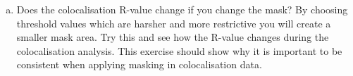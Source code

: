 \documentclass[a4paper,oneside,article]{memoir}
\begin{document}
\begin{enumerate}[(a)]
      \item Does the colocalisation R-value change if you change the
      mask? By choosing threshold values which are harsher and more
      restrictive you will create a smaller mask area. Try this and see
      how the R-value changes during the colocalisation analysis. This
      exercise should show why it is important to be consistent when
      applying masking in colocalisation data.
    \end{enumerate}
\end{document}
